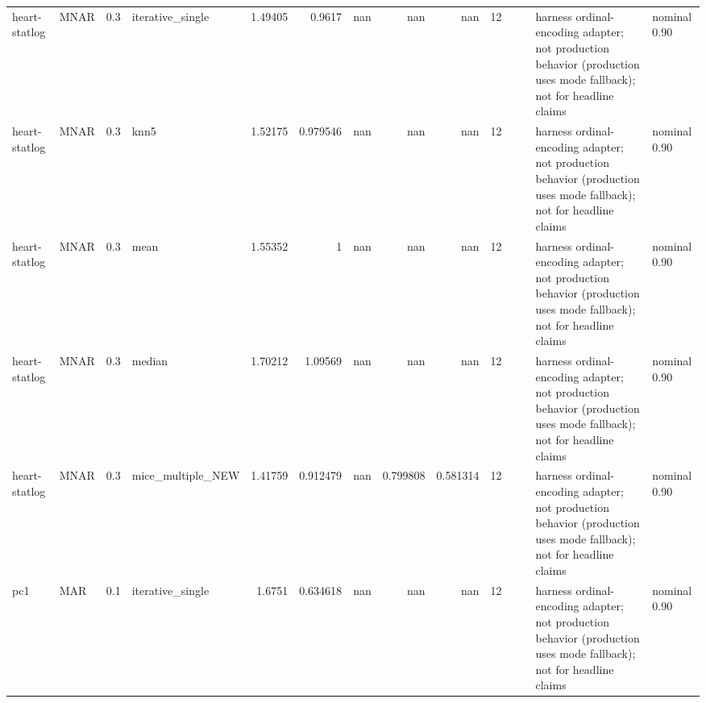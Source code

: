 \begin{table}[ht]
\begin{tabular}{llrlrrrrrrllll}
 heart-statlog        & MNAR        &         0.3 & iterative\_single  &       1.49405  &             0.9617   &               nan        &                     nan        &                       nan        &        12 &                    &                                         & harness ordinal-encoding adapter; not production behavior (production uses mode fallback); not for headline claims & nominal 0.90              \\
 heart-statlog        & MNAR        &         0.3 & knn5              &       1.52175  &             0.979546 &               nan        &                     nan        &                       nan        &        12 &                    &                                         & harness ordinal-encoding adapter; not production behavior (production uses mode fallback); not for headline claims & nominal 0.90              \\
 heart-statlog        & MNAR        &         0.3 & mean              &       1.55352  &             1        &               nan        &                     nan        &                       nan        &        12 &                    &                                         & harness ordinal-encoding adapter; not production behavior (production uses mode fallback); not for headline claims & nominal 0.90              \\
 heart-statlog        & MNAR        &         0.3 & median            &       1.70212  &             1.09569  &               nan        &                     nan        &                       nan        &        12 &                    &                                         & harness ordinal-encoding adapter; not production behavior (production uses mode fallback); not for headline claims & nominal 0.90              \\
 heart-statlog        & MNAR        &         0.3 & mice\_multiple\_NEW &       1.41759  &             0.912479 &               nan        &                       0.799808 &                         0.581314 &        12 &                    &                                         & harness ordinal-encoding adapter; not production behavior (production uses mode fallback); not for headline claims & nominal 0.90              \\
 pc1                  & MAR         &         0.1 & iterative\_single  &       1.6751   &             0.634618 &               nan        &                     nan        &                       nan        &        12 &                    &                                         & harness ordinal-encoding adapter; not production behavior (production uses mode fallback); not for headline claims & nominal 0.90              \\

\end{tabular}
\end{table}
